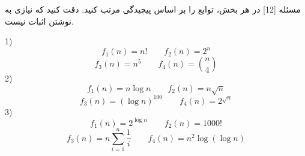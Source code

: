 ‌مسئله [12]
در هر بخش، توابع را بر اساس پیچیدگی مرتب کنید. دقت کنید که نیازی به نوشتن اثبات نیست.

1)
$$ f_1(n) = n! \qquad f_2(n) = 2^n $$
$$ f_3(n) = n^5 \qquad f_4(n) = \binom{n}{4} $$
2)
$$ f_1(n) = n\log n \qquad f_2(n) = n\sqrt{n} $$
$$ f_3(n) = (\log n) ^ {100} \qquad f_4(n) = 2 ^{ \sqrt{n}}$$
3)
$$ f_1(n) = 2 ^ {\log n} \qquad f_2(n) = 1000! $$
$$ f_3(n) = n \sum_{i=1}^{n} \frac{1}{i} \qquad f_4(n) = n^2 \log(\log n)$$


% 
%
%
% 

